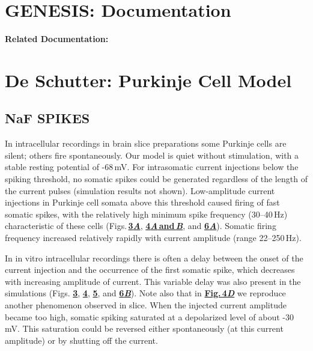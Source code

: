 \documentclass[12pt]{article}
\begin{document}
\section*{GENESIS: Documentation}

{\bf Related Documentation:}

\section*{De Schutter: Purkinje Cell Model}

\subsection*{NaF SPIKES}

In intracellular recordings in brain slice preparations
some Purkinje cells are silent; others fire spontaneously.
Our model is quiet without stimulation, with a stable
resting potential of -68\,mV. For intrasomatic current injections
below the spiking threshold, no somatic spikes
could be generated regardless of the length of the current
pulses (simulation results not shown). Low-amplitude
current injections in Purkinje cell somata above this threshold
caused firing of fast somatic spikes, with the relatively
high minimum spike frequency (30--40\,Hz) characteristic
of these cells (Figs.\,\href{../pub-purkinje-deschutter1-fig-3/pub-purkinje-deschutter1-fig-3.tex}{\bf 3{\it A}}, \href{../pub-purkinje-deschutter1-fig-4/pub-purkinje-deschutter1-fig-4.tex}{\bf 4{\it A}\,and\,{\it B}}, and \href{../pub-purkinje-deschutter1-fig-6/pub-purkinje-deschutter1-fig-6.tex}{\bf 6{\it A}}). Somatic firing
frequency increased relatively rapidly with current amplitude
(range 22--250\,Hz).

In in vitro intracellular recordings there is often a delay
between the onset of the current injection and the occurrence
of the first somatic spike, which decreases with increasing
amplitude of current. This variable delay was also
present in the simulations (Figs. \href{../pub-purkinje-deschutter1-fig-3/pub-purkinje-deschutter1-fig-3.tex}{\bf 3}, \href{../pub-purkinje-deschutter1-fig-4/pub-purkinje-deschutter1-fig-4.tex}{\bf 4}, \href{../pub-purkinje-deschutter1-fig-5/pub-purkinje-deschutter1-fig-5.tex}{\bf 5}, and \href{../pub-purkinje-deschutter1-fig-6/pub-purkinje-deschutter1-fig-6.tex}{\bf 6{\it B}}). Note also
that in \href{../pub-purkinje-deschutter1-fig-4/pub-purkinje-deschutter1-fig-4.tex}{\bf Fig.\,4{\it D}} we reproduce another phenomenon observed
in slice. When the injected current amplitude became
too high, somatic spiking saturated at a depolarized
level of about -30\,mV. This saturation could be reversed
either spontaneously (at this current amplitude) or by shutting
off the current.
\end{document}
